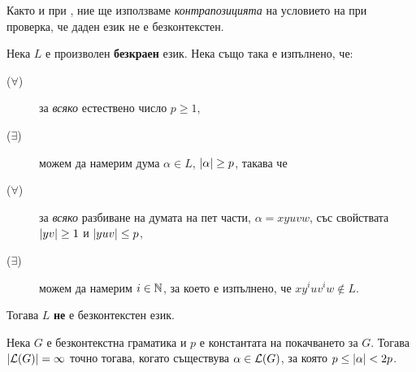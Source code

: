Както и при , ние ще използваме \emph{контрапозицията} на условието на 
при проверка, че даден език не е безконтекстен.

\begin{corollary}
  \label{cor:pumping-context-free}
  Нека $L$ е произволен {\bf безкраен} език. Нека също така е изпълнено, че:
  \begin{description}
  \item[($\forall$)]
    за {\em всяко} естествено число $p \geq 1$,
  \item[($\exists$)]
    можем да намерим дума $\alpha \in L$, $\vert{\alpha}\vert\geq p$, такава че
  \item[($\forall$)]
    за {\em всяко} разбиване на думата на пет части, $\alpha = xyuvw$, със свойствата $\vert{yv}\vert \geq 1$ и $\vert{yuv}\vert \leq p$,
  \item[($\exists$)]
    можем да намерим $i \in \mathbb{N}$, за което е изпълнено, че $xy^iuv^iw \not\in L$.
  \end{description}  
  Тогава $L$ {\bf не} е безконтекстен език.
\end{corollary}

\begin{corollary}
  Нека $G$ е безконтекстна граматика и $p$ е константата на покачването за $G$.
  Тогава $\vert{\mathcal{L}(G)}\vert = \infty$ точно тогава, когато съществува $\alpha \in \mathcal{L}(G)$, за която $p \leq \vert{\alpha}\vert < 2p$.
\end{corollary}



